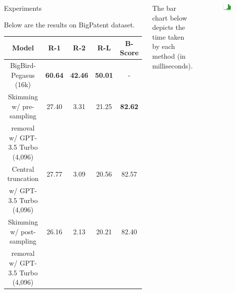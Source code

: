 \documentclass[20pt]{beamer}
\begin{document}
\begin{frame}[t]
\begin{columns}[t]
\begin{block}{Experiments}
\begin{table}[!ht]
      \label{tab:govreport}
    \end{table}

    Below are the results on BigPatent dataset.
    
    \begin{table}[!t]
      \centering
      \small
    
      \begin{tabular}{c c c c c}
        \hline
        Model & R-1 & R-2 & R-L & B-Score \\
        \hline
        BigBird-Pegasus (16k) & \textbf{60.64} & \textbf{42.46} & \textbf{50.01} & - \\
        \hline
        Skimming w/ pre-sampling & 27.40 & 3.31 & 21.25 & \textbf{82.62} \\
        removal w/ GPT-3.5 Turbo (4,096) & & & & \\
        Central truncation & 27.77 & 3.09 & 20.56 & 82.57 \\
        w/ GPT-3.5 Turbo (4,096) & & & & \\
        Skimming w/ post-sampling & 26.16 & 2.13 & 20.21 & 82.40 \\
        removal w/ GPT-3.5 Turbo (4,096) & & & & \\
        \hline
      \end{tabular}

      \label{tab:bigpatent}
    \end{table}
  \end{block}


  \vspace{.8cm}
  \begin{minipage}{\columnwidth}
    The bar chart below depicts the time taken by each method (in milliseconds).
    \begin{figure}[!h]
      \centering
      \includegraphics[width=.8\textwidth]{images/encoder-times.png}
    \end{figure}
  \end{minipage}
  

\end{columns}
\end{frame}
\end{document}
